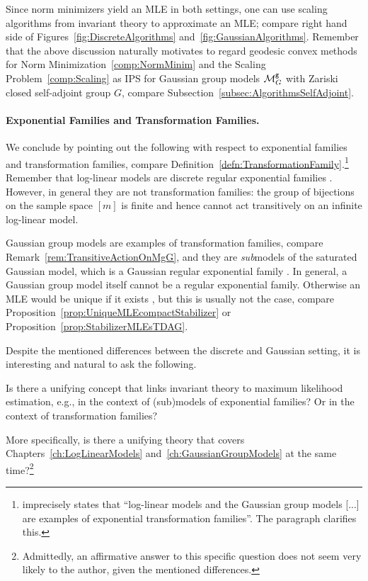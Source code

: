 Since norm minimizers yield an MLE in both settings, one can use scaling algorithms from invariant theory to approximate an MLE; compare right hand side of Figures~\ref{fig:DiscreteAlgorithms} and~\ref{fig:GaussianAlgorithms}. Remember that the above discussion naturally motivates to regard geodesic convex methods for Norm Minimization~\ref{comp:NormMinim} and the Scaling Problem~\ref{comp:Scaling}
as IPS for Gaussian group models $\mathcal{M}^{\mathtt{g}}_G$ with Zariski closed self-adjoint group $G$, compare Subsection~\ref{subsec:AlgorithmsSelfAdjoint}.


\paragraph{Exponential Families and Transformation Families.}
We conclude by pointing out the following with respect to exponential families and transformation families, compare Definition~\ref{defn:TransformationFamily}.\footnote{\cite[Section~6]{DiscretePaper} imprecisely states that ``log-linear models and the Gaussian group models [...] are examples of exponential transformation families''. The paragraph clarifies this.}
Remember that log-linear models are discrete regular exponential families \cite[Section~6.2]{SullivantBook}. However, in general they are not transformation families: the group of bijections on the sample space $[m]$ is finite and hence cannot act transitively on an infinite log-linear model.

Gaussian group models are examples of transformation families, compare Remark~\ref{rem:TransitiveActionOnMgG}, and they are \emph{sub}models of the saturated Gaussian model, which is a Gaussian regular exponential family \cite[Section~6.3]{SullivantBook}. In general, a Gaussian group model itself cannot be a regular exponential family. Otherwise an MLE would be unique if it exists \cite[Corollary~7.3.8]{SullivantBook}, but this is usually not the case, compare Proposition~\ref{prop:UniqueMLEcompactStabilizer} or Proposition~\ref{prop:StabilizerMLEsTDAG}.

Despite the mentioned differences between the discrete and Gaussian setting, it is interesting and natural to ask the following.

\begin{problem}\label{prob:UnifyingConcept}
Is there a unifying concept that links invariant theory to maximum likelihood estimation, e.g., in the context of (sub)models of exponential families? Or in the context of transformation families?

More specifically, is there a unifying theory that covers Chapters~\ref{ch:LogLinearModels} and~\ref{ch:GaussianGroupModels} at the same time?\footnote{Admittedly, an affirmative answer to this specific question does not seem very likely to the author, given the mentioned differences.}
\end{problem}


